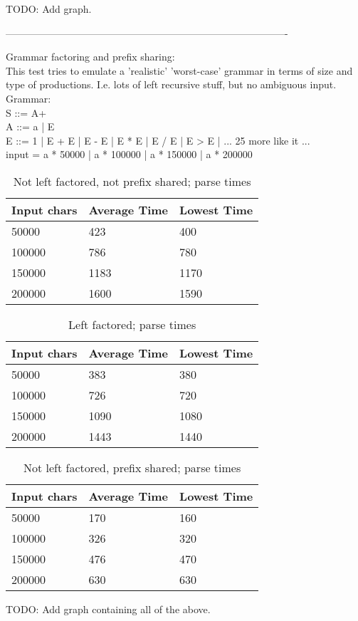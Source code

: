 \documentclass[a4paper,10pt]{article}
\begin{document}
TODO: Add graph.

-------------------------------------------------------------------------------------

Grammar factoring and prefix sharing:\\
This test tries to emulate a 'realistic' 'worst-case' grammar in terms of size and type of productions. I.e. lots of left recursive stuff, but no ambiguous input.\\

Grammar:\\
S ::= A+\\
A ::= a | E\\
E ::= 1 | E + E | E - E | E * E | E / E | E > E | ... 25 more like it ...\\
input = a * 50000 | a * 100000 | a * 150000 | a * 200000\\

\begin{table}
\centering
\begin{tabular}{ | p{5em} | p{7em} | p{6em} | }
  \hline
  Input chars & Average Time & Lowest Time \\
  \hline
  50000 & 423 & 400 \\
  100000 & 786 & 780 \\
  150000 & 1183 & 1170 \\
  200000 & 1600 & 1590 \\
  \hline
\end{tabular}
\caption{Not left factored, not prefix shared; parse times}
\end{table}

\begin{table}
\centering
\begin{tabular}{ | p{5em} | p{7em} | p{6em} | }
  \hline
  Input chars & Average Time & Lowest Time \\
  \hline
  50000 & 383 & 380 \\
  100000 & 726 & 720 \\
  150000 & 1090 & 1080 \\
  200000 & 1443 & 1440 \\
  \hline
\end{tabular}
\caption{Left factored; parse times}
\end{table}

\begin{table}
\centering
\begin{tabular}{ | p{5em} | p{7em} | p{6em} | }
  \hline
  Input chars & Average Time & Lowest Time \\
  \hline
  50000 & 170 & 160 \\
  100000 & 326 & 320 \\
  150000 & 476 & 470 \\
  200000 & 630 & 630 \\
  \hline
\end{tabular}
\caption{Not left factored, prefix shared; parse times}
\end{table}

TODO: Add graph containing all of the above.\\
\end{document}
